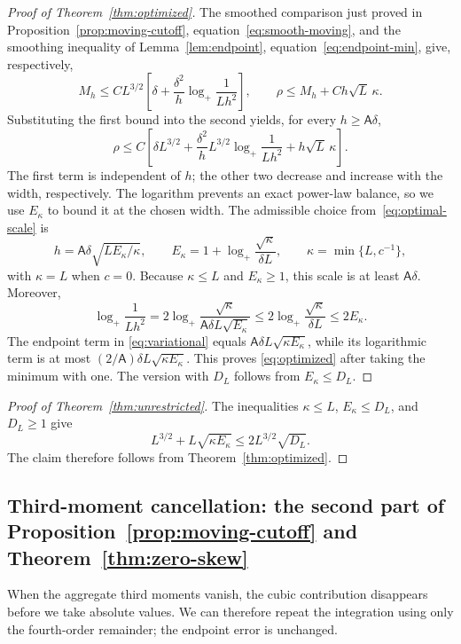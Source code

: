 \documentclass[11pt,letterpaper]{article}
\newcommand{\Ac}{\mathsf A}
\theoremstyle{remark}
\begin{document}
\begin{proof}[Proof of Theorem~\ref{thm:optimized}]
The smoothed comparison just proved in
Proposition~\ref{prop:moving-cutoff}, equation~\eqref{eq:smooth-moving},
and the smoothing inequality of Lemma~\ref{lem:endpoint},
equation~\eqref{eq:endpoint-min}, give, respectively,
\[
 M_h\le CL^{3/2}\left[\delta+\frac{\delta^2}{h}
          \log_+\frac1{Lh^2}\right],
 \qquad \rho\le M_h+Ch\sqrt L\,\kappa.
\]
Substituting the first bound into the second yields, for every
\(h\ge\Ac\delta\),
\begin{equation}
 \rho\le C\left[
 \delta L^{3/2}
 +\frac{\delta^2}{h}L^{3/2}\log_+\frac1{Lh^2}
 +h\sqrt L\,\kappa\right].
 \label{eq:variational}
\end{equation}
The first term is independent of \(h\); the other two decrease and
increase with the width, respectively. The logarithm prevents an exact
power-law balance, so we use \(E_\kappa\) to bound it at the chosen width.
The admissible choice from~\eqref{eq:optimal-scale} is
\[
 h=\Ac\delta\sqrt{LE_\kappa/\kappa},\qquad
 E_\kappa=1+\log_+\frac{\sqrt\kappa}{\delta L},\qquad
 \kappa=\min\{L,c^{-1}\},
\]
with \(\kappa=L\) when \(c=0\). Because \(\kappa\le L\) and \(E_\kappa\ge1\), this scale is at least
\(\Ac\delta\). Moreover,
\[
 \log_+\frac1{Lh^2}
 =2\log_+\frac{\sqrt\kappa}{\Ac\delta L\sqrt{E_\kappa}}
 \le2\log_+\frac{\sqrt\kappa}{\delta L}
 \le2E_\kappa.
\]
The endpoint term in \eqref{eq:variational} equals
\(\Ac\delta L\sqrt{\kappa E_\kappa}\), while its logarithmic term is at
most \((2/\Ac)\delta L\sqrt{\kappa E_\kappa}\).
This proves \eqref{eq:optimized} after taking the minimum with one.
The version with \(D_L\) follows from \(E_\kappa\le D_L\).
\end{proof}

\begin{proof}[Proof of Theorem~\ref{thm:unrestricted}]
The inequalities \(\kappa\le L\), \(E_\kappa\le D_L\), and \(D_L\ge1\) give
\[
 L^{3/2}+L\sqrt{\kappa E_\kappa}
 \le 2L^{3/2}\sqrt{D_L}.
\]
The claim therefore follows from Theorem~\ref{thm:optimized}.
\end{proof}

\subsection{\texorpdfstring{Third-moment cancellation: the second part of Proposition~\ref{prop:moving-cutoff} and Theorem~\ref{thm:zero-skew}}{Third-moment cancellation: the second part of Proposition 2 and Theorem 3}}\label{zs:section}
When the aggregate third moments vanish, the cubic contribution
disappears before we take absolute values. We can therefore repeat
the integration using only the fourth-order remainder; the endpoint
error is unchanged.
\end{document}

